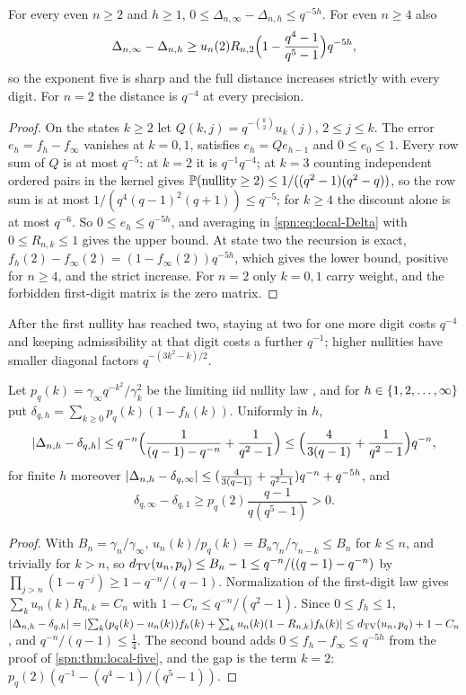 \begin{theorem}\label{spn:thm:local-five}
For every even $n\ge2$ and $h\ge1$, $0\le\Delta_{n,\infty}-\Delta_{n,h}\le q^{-5h}$. For even $n\ge4$
also
\[
 \Delta_{n,\infty}-\Delta_{n,h}\ge u_n(2)R_{n,2}\Bigl(1-\frac{q^4-1}{q^5-1}\Bigr)q^{-5h},
\]
so the exponent five is sharp and the full distance increases strictly with every digit. For $n=2$
the distance is $q^{-4}$ at every precision.
\end{theorem}
\begin{proof}
On the states $k\ge2$ let $Q(k,j)=q^{-\binom k2}u_k(j)$, $2\le j\le k$. The error
$e_h=f_h-f_\infty$ vanishes at $k=0,1$, satisfies $e_h=Qe_{h-1}$ and $0\le e_0\le1$. Every row sum of
$Q$ is at most $q^{-5}$: at $k=2$ it is $q^{-1}q^{-4}$; at $k=3$ counting independent ordered pairs in
the kernel gives $\mathbb{P}(\text{nullity}\ge2)\le1/((q^2-1)(q^2-q))$, so the row sum is at most
$1/(q^4(q-1)^2(q+1))\le q^{-5}$; for $k\ge4$ the discount alone is at most $q^{-6}$. So
$0\le e_h\le q^{-5h}$, and averaging in \eqref{spn:eq:local-Delta} with $0\le R_{n,k}\le1$ gives the upper
bound. At state two the recursion is exact, $f_h(2)-f_\infty(2)=(1-f_\infty(2))q^{-5h}$, which gives the
lower bound, positive for $n\ge4$, and the strict increase. For $n=2$ only $k=0,1$ carry weight, and
the forbidden first-digit matrix is the zero matrix.
\end{proof}

After the first nullity has reached two, staying at two for one more digit costs $q^{-4}$ and keeping
admissibility at that digit costs a further $q^{-1}$; higher nullities have smaller diagonal factors
$q^{-(3k^2-k)/2}$.

\begin{theorem}\label{spn:thm:local-limit}
Let $p_q(k)=\gamma_\infty q^{-k^2}/\gamma_k^2$ be the limiting iid nullity law \cite{Fulman2015Stein}, and for
$h\in\{1,2,\dots,\infty\}$ put $\delta_{q,h}=\sum_{k\ge0}p_q(k)(1-f_h(k))$. Uniformly in $h$,
\[
 \lvert\Delta_{n,h}-\delta_{q,h}\rvert\le q^{-n}\Bigl(\frac1{(q-1)-q^{-n}}+\frac1{q^2-1}\Bigr)\le
 \Bigl(\frac4{3(q-1)}+\frac1{q^2-1}\Bigr)q^{-n},
\]
for finite $h$ moreover $\lvert\Delta_{n,h}-\delta_{q,\infty}\rvert\le(\frac4{3(q-1)}+\frac1{q^2-1})q^{-n}+q^{-5h}$,
and
\[
 \delta_{q,\infty}-\delta_{q,1}\ge p_q(2)\frac{q-1}{q(q^5-1)}>0 .
\]
\end{theorem}
\begin{proof}
With $B_n=\gamma_n/\gamma_\infty$, $u_n(k)/p_q(k)=B_n\gamma_n/\gamma_{n-k}\le B_n$ for $k\le n$, and trivially for $k>n$,
so $d_{\mathrm{TV}}(u_n,p_q)\le B_n-1\le q^{-n}/((q-1)-q^{-n})$ by $\prod_{j>n}(1-q^{-j})\ge1-q^{-n}/(q-1)$.
Normalization of the first-digit law gives $\sum_ku_n(k)R_{n,k}=C_n$ with $1-C_n\le q^{-n}/(q^2-1)$.
Since $0\le f_h\le1$,
$\lvert\Delta_{n,h}-\delta_{q,h}\rvert=\lvert\sum_k(p_q(k)-u_n(k))f_h(k)+\sum_ku_n(k)(1-R_{n,k})f_h(k)\rvert\le d_{\mathrm{TV}}(u_n,p_q)+1-C_n$,
and $q^{-n}/(q-1)\le\tfrac14$. The second bound adds $0\le f_h-f_\infty\le q^{-5h}$ from the proof of
\cref{spn:thm:local-five}, and the gap is the term $k=2$:
$p_q(2)(q^{-1}-(q^4-1)/(q^5-1))$.
\end{proof}


